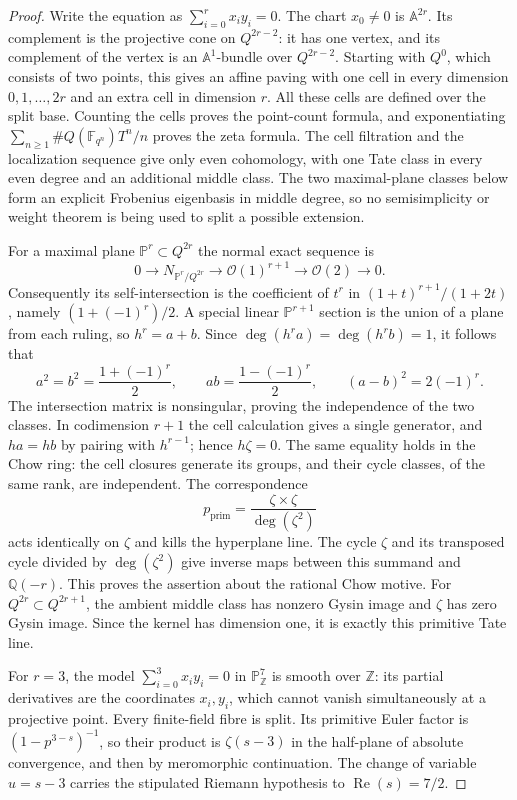 \begin{proof}
Write the equation as $\sum_{i=0}^r x_i y_i=0$. The chart $x_0\ne0$ is $\mathbb A^{2r}$. Its complement is the projective cone on $Q^{2r-2}$: it has one vertex, and its complement of the vertex is an $\mathbb A^1$-bundle over $Q^{2r-2}$. Starting with $Q^0$, which consists of two points, this gives an affine paving with one cell in every dimension $0,1,\ldots,2r$ and an extra cell in dimension $r$. All these cells are defined over the split base. Counting the cells proves the point-count formula, and exponentiating $\sum_{n\ge1}\#Q(\mathbb F_{q^n})T^n/n$ proves the zeta formula. The cell filtration and the localization sequence give only even cohomology, with one Tate class in every even degree and an additional middle class. The two maximal-plane classes below form an explicit Frobenius eigenbasis in middle degree, so no semisimplicity or weight theorem is being used to split a possible extension.

For a maximal plane $\mathbb P^r\subset Q^{2r}$ the normal exact sequence is
\[
 0\longrightarrow N_{\mathbb P^r/Q^{2r}}
 \longrightarrow\mathcal O(1)^{r+1}
 \longrightarrow\mathcal O(2)\longrightarrow0.
\]
Consequently its self-intersection is the coefficient of $t^r$ in
$(1+t)^{r+1}/(1+2t)$, namely $(1+(-1)^r)/2$. A special linear
$\mathbb P^{r+1}$ section is the union of a plane from each ruling, so
$h^r=a+b$. Since $\deg(h^r a)=\deg(h^r b)=1$, it follows that
\[
 a^2=b^2=\frac{1+(-1)^r}{2},\qquad
 ab=\frac{1-(-1)^r}{2},\qquad
 (a-b)^2=2(-1)^r.
\]
The intersection matrix is nonsingular, proving the independence of the two classes. In codimension $r+1$ the cell calculation gives a single generator, and $ha=hb$ by pairing with $h^{r-1}$; hence $h\zeta=0$. The same equality holds in the Chow ring: the cell closures generate its groups, and their cycle classes, of the same rank, are independent. The correspondence
\[
 p_{\mathrm{prim}}=\frac{\zeta\times\zeta}{\deg(\zeta^2)}
\]
acts identically on $\zeta$ and kills the hyperplane line. The cycle $\zeta$ and its transposed cycle divided by $\deg(\zeta^2)$ give inverse maps between this summand and $\mathbb Q(-r)$. This proves the assertion about the rational Chow motive. For $Q^{2r}\subset Q^{2r+1}$, the ambient middle class has nonzero Gysin image and $\zeta$ has zero Gysin image. Since the kernel has dimension one, it is exactly this primitive Tate line.

For $r=3$, the model $\sum_{i=0}^3x_i y_i=0$ in $\mathbb P^7_{\mathbb Z}$ is smooth over $\mathbb Z$: its partial derivatives are the coordinates $x_i,y_i$, which cannot vanish simultaneously at a projective point. Every finite-field fibre is split. Its primitive Euler factor is $(1-p^{3-s})^{-1}$, so their product is $\zeta(s-3)$ in the half-plane of absolute convergence, and then by meromorphic continuation. The change of variable $u=s-3$ carries the stipulated Riemann hypothesis to $\operatorname{Re}(s)=7/2$.
\end{proof}

